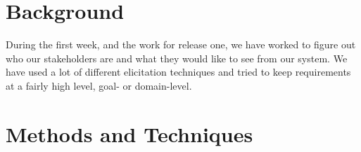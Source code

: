 \documentclass[10pt,a4paper]{article}
\begin{document}
\section{Background}
During the first week, and the work for release one, we have worked to figure out who our stakeholders are and what they would like to see from our system. We have used a lot of different elicitation techniques and tried to keep requirements at a fairly high level, goal- or domain-level. 


\section{Methods and Techniques}




\end{document}
